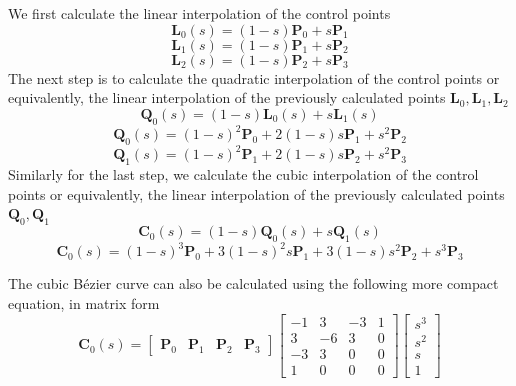 We first calculate the linear interpolation of the control points
\begin{equation}
\mathbf{L}_0(s) = (1-s)\mathbf{P}_0 + s\mathbf{P}_1
\end{equation}
\[
\mathbf{L}_1(s) = (1-s)\mathbf{P}_1 + s\mathbf{P}_2
\]
\[
\mathbf{L}_2(s) = (1-s)\mathbf{P}_2 + s\mathbf{P}_3
\]
The next step is to calculate the quadratic interpolation of the control points or equivalently, the linear interpolation of the previously calculated points $\mathbf{L}_0,\mathbf{L}_1,\mathbf{L}_2$
\[
\mathbf{Q}_0(s) = (1-s)\mathbf{L}_0(s) + s\mathbf{L}_1(s)
\]
\begin{equation}
\mathbf{Q}_0(s) = (1-s)^2\mathbf{P}_0 + 2(1-s)s\mathbf{P}_1 + s^2\mathbf{P}_2
\end{equation}
\[
\mathbf{Q}_1(s) = (1-s)^2\mathbf{P}_1 + 2(1-s)s\mathbf{P}_2 + s^2\mathbf{P}_3
\]
Similarly for the last step, we calculate the cubic interpolation of the control points or equivalently, the linear interpolation of the previously calculated points $\mathbf{Q}_0,\mathbf{Q}_1$
\[
\mathbf{C}_0(s) = (1-s)\mathbf{Q}_0(s) + s\mathbf{Q}_1(s)
\]
\begin{equation}
\mathbf{C}_0(s) = (1-s)^3\mathbf{P}_0 +3(1-s)^2 s\mathbf{P}_1 + 3(1-s)s^2\mathbf{P}_2 + s^3\mathbf{P}_3
\end{equation}

The cubic B\'ezier curve can also be calculated using the following more compact equation, in matrix form
\begin{equation}
\mathbf{C}_0(s) = \begin{bmatrix} \mathbf{P}_0 & \mathbf{P}_1 & \mathbf{P}_2 & \mathbf{P}_3 \end{bmatrix} 
\begin{bmatrix} 
-1 & 3 & -3 & 1 \\
3 & -6 & 3 & 0 \\
-3 & 3 & 0 & 0 \\
1 & 0 & 0 & 0
\end{bmatrix}
\begin{bmatrix}
s^3 \\ s^2 \\ s \\ 1
\end{bmatrix}
\end{equation}

